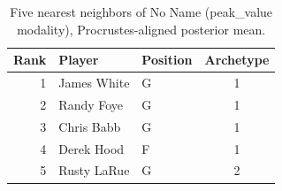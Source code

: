 \begin{table}[htbp]
  \centering\small
  \begin{tabular}{rllc}
    \toprule
    Rank & Player & Position & Archetype \\
    \midrule
    1 & James White & G & 1 \\
    2 & Randy Foye & G & 1 \\
    3 & Chris Babb & G & 1 \\
    4 & Derek Hood & F & 1 \\
    5 & Rusty LaRue & G & 2 \\
    \bottomrule
  \end{tabular}
  \caption{Five nearest neighbors of No Name (peak_value modality), Procrustes-aligned posterior mean.}
  \label{tab:No_Name_neighbors_peak_value}
\end{table}

